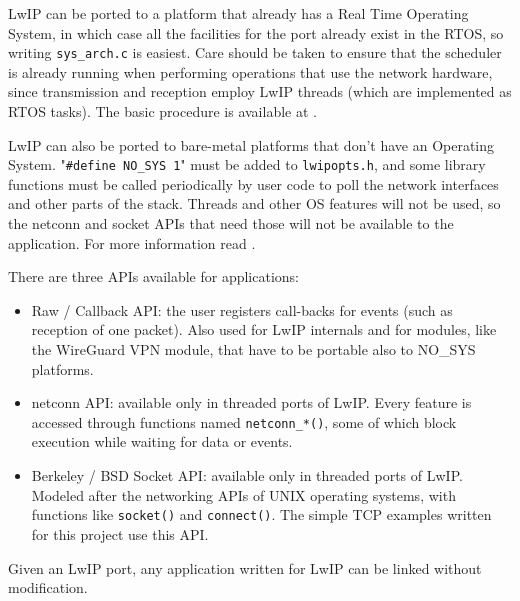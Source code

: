 
LwIP can be ported to a platform that already has a Real Time Operating System, in which case all the facilities for the port already exist in the RTOS, so writing \texttt{sys\_arch.c} is easiest. Care should be taken to ensure that the scheduler is already running when performing operations that use the network hardware, since transmission and reception employ LwIP threads (which are implemented as RTOS tasks). The basic procedure is available at \cite{lwip_port_os}.

LwIP can also be ported to bare-metal platforms that don't have an Operating System. "\texttt{\#define NO\_SYS 1}" \cite{lwip_nosys_doc} must be added to \texttt{lwipopts.h}, and some library functions must be called periodically by user code to poll the network interfaces and other parts of the stack. Threads and other OS features will not be used, so the netconn and socket APIs that need those will not be available to the application. For more information read \cite{lwip_port_nosys}.

There are three APIs available for applications:
\begin{itemize}
    \item Raw / Callback API: \cite{lwip_raw} the user registers call-backs for events (such as reception of one packet). Also used for LwIP internals and for modules, like the WireGuard VPN module, that have to be portable also to NO\_SYS platforms.
    \item netconn API: \cite{lwip_netconn} available only in threaded ports of LwIP. Every feature is accessed through functions named \texttt{netconn\_*()}, some of which block execution while waiting for data or events.
    \item Berkeley / BSD Socket API: \cite{lwip_socket} available only in threaded ports of LwIP. Modeled after the networking APIs of UNIX operating systems, with functions like \texttt{socket()} and \texttt{connect()}. The simple TCP examples written for this project use this API.
\end{itemize}

Given an LwIP port, any application written for LwIP can be linked without modification.











